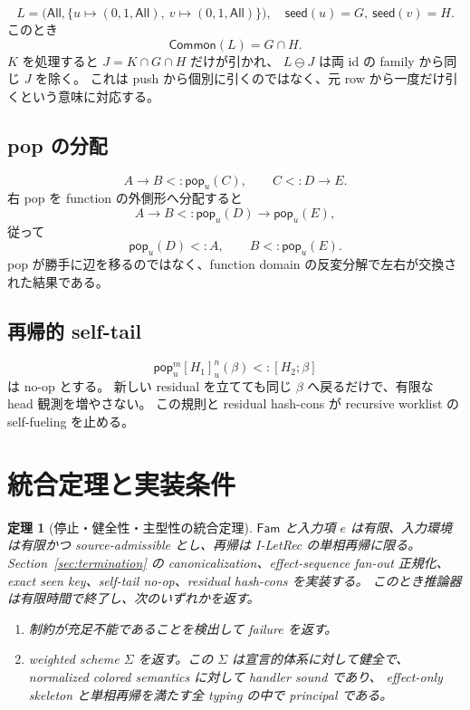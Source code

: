 \documentclass[uplatex,dvipdfmx,a4paper,10.5pt]{jsarticle}
\theoremstyle{jpplain}
\newtheorem{theorem}[definition]{定理}
\newcommand{\Fam}{\mathsf{Fam}}
\newcommand{\All}{\mathsf{All}}
\newcommand{\Common}{\mathsf{Common}}
\newcommand{\takeop}[2]{[#1]_{#2}}
\newcommand{\popop}[1]{\mathsf{pop}_{#1}}
\newcommand{\row}[2]{[#1;#2]}
\newcommand{\seedcap}{\mathsf{seed}}
\begin{document}
\[
  L=\bigl(\All,\{u\mapsto(0,1,\All),\ v\mapsto(0,1,\All)\}\bigr),
  \quad \seedcap(u)=G,\ \seedcap(v)=H.
\]
このとき
\[
  \Common(L)=G\cap H.
\]
$K$ を処理すると $J=K\cap G\cap H$ だけが引かれ、
$L\ominus J$ は両 id の family から同じ $J$ を除く。
これは push から個別に引くのではなく、元 row から一度だけ引くという意味に対応する。

\subsection{pop の分配}

\[
  A\to B <: \popop{u}(C),
  \qquad C<:D\to E.
\]
右 pop を function の外側形へ分配すると
\[
  A\to B <: \popop{u}(D)\to\popop{u}(E),
\]
従って
\[
  \popop{u}(D)<:A,
  \qquad B<:\popop{u}(E).
\]
pop が勝手に辺を移るのではなく、function domain の反変分解で左右が交換された結果である。

\subsection{再帰的 self-tail}

\[
  \popop{u}^{m}\takeop{H_1}{u}^{n}(\beta)<:\row{H_2}{\beta}
\]
は no-op とする。
新しい residual を立てても同じ $\beta$ へ戻るだけで、有限な head 観測を増やさない。
この規則と residual hash-cons が recursive worklist の self-fueling を止める。

\section{統合定理と実装条件}

\begin{theorem}[停止・健全性・主型性の統合定理]\label{thm:main}
$\Fam$ と入力項 $e$ は有限、入力環境は有限かつ source-admissible とし、再帰は I-LetRec の単相再帰に限る。
Section~\ref{sec:termination} の canonicalization、effect-sequence fan-out 正規化、exact seen key、self-tail no-op、residual hash-cons を実装する。
このとき推論器は有限時間で終了し、次のいずれかを返す。
\begin{enumerate}
  \item 制約が充足不能であることを検出して failure を返す。
  \item weighted scheme $\Sigma$ を返す。この $\Sigma$ は宣言的体系に対して健全で、
        normalized colored semantics に対して handler sound であり、
        effect-only skeleton と単相再帰を満たす全 typing の中で principal である。
\end{enumerate}
\end{theorem}
\end{document}
